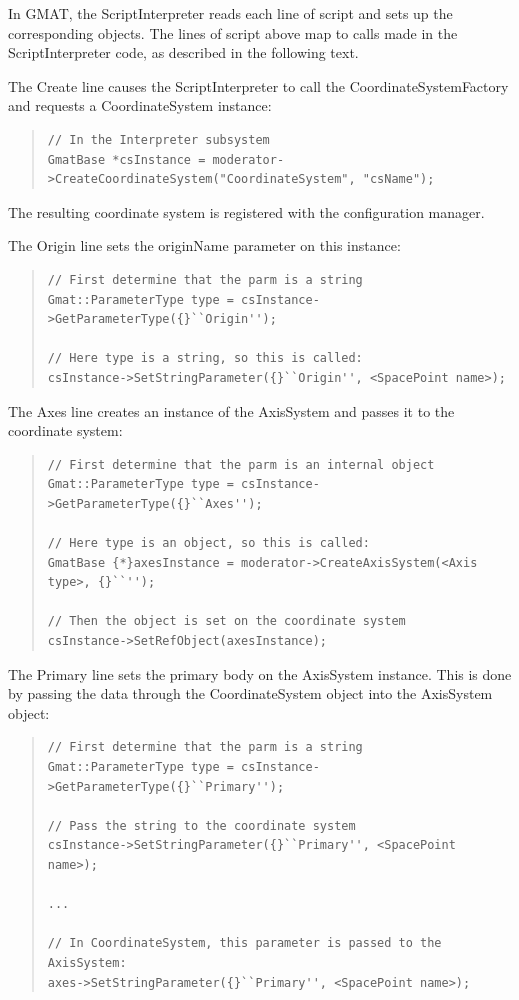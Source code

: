 In GMAT, the ScriptInterpreter reads each line of script and sets up the corresponding objects. The
lines of script above map to calls made in the ScriptInterpreter code, as described in the following
text.

The Create line causes the ScriptInterpreter to call the CoordinateSystemFactory and requests a
CoordinateSystem instance:

\begin{quotation}
\begin{verbatim}
// In the Interpreter subsystem
GmatBase *csInstance = moderator->CreateCoordinateSystem("CoordinateSystem", "csName");
\end{verbatim}
\end{quotation}

The resulting coordinate system is registered with the configuration manager.

The Origin line sets the originName parameter on this instance:

\begin{quotation}
\begin{verbatim}
// First determine that the parm is a string
Gmat::ParameterType type = csInstance->GetParameterType({}``Origin'');

// Here type is a string, so this is called:
csInstance->SetStringParameter({}``Origin'', <SpacePoint name>);
\end{verbatim}
\end{quotation}

The Axes line creates an instance of the AxisSystem and passes it to the coordinate system:

\begin{quotation}
\begin{verbatim}
// First determine that the parm is an internal object
Gmat::ParameterType type = csInstance->GetParameterType({}``Axes'');

// Here type is an object, so this is called:
GmatBase {*}axesInstance = moderator->CreateAxisSystem(<Axis type>, {}``'');

// Then the object is set on the coordinate system
csInstance->SetRefObject(axesInstance);
\end{verbatim}
\end{quotation}

The Primary line sets the primary body on the AxisSystem instance.  This is done by passing the data
through the CoordinateSystem object into the AxisSystem object:

\begin{quotation}
\begin{verbatim}
// First determine that the parm is a string
Gmat::ParameterType type = csInstance->GetParameterType({}``Primary'');

// Pass the string to the coordinate system
csInstance->SetStringParameter({}``Primary'', <SpacePoint name>);

...

// In CoordinateSystem, this parameter is passed to the AxisSystem:
axes->SetStringParameter({}``Primary'', <SpacePoint name>);
\end{verbatim}
\end{quotation}

